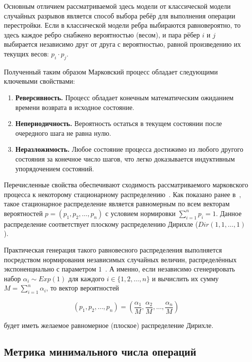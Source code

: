Основным отличием рассматриваемой здесь модели от классической модели случайных разрывов является способ выбора ребёр для выполнения операции перестройки.
Если в классической модели ребра выбираются равновероятно, то здесь каждое ребро снабжено вероятностью (весом), и пара рёбер $i$ и $j$ выбирается независимо друг от друга с вероятностью, равной произведению их текущих весов: $p_i \cdot p_j$.

Полученный таким образом Марковский процесс обладает следующими ключевыми свойствами:

\begin{enumerate}
    \item \textbf{Реверсивность.} Процесс обладает конечным математическим ожиданием времени возврата в исходное состояние.
    \item \textbf{Непериодичность.} Вероятность остаться в текущем состоянии после очередного шага не равна нулю.
    \item \textbf{Неразложимость.} Любое состояние процесса достижимо из любого другого состояния за конечное число шагов, что легко доказывается индуктивным упорядочением состояний.
\end{enumerate}

Перечисленные свойства обеспечивают сходимость рассматриваемого марковского процесса к некоторому стационарному распределению~\cite{teor-ver}.
Как показано ранее в~\cite{tannier2016}, такое стационарное распределение является равномерным по всем векторам вероятностей $p = (p_1, p_2, \dots, p_n)$ с условием нормировки $\sum_{i=1}^{n} p_i = 1$.
Данное распределение соответствует плоскому распределению Дирихле ($Dir(1, 1, \dots, 1)$).

Практическая генерация такого равновесного распределения выполняется посредством нормирования независимых случайных величин, распределённых экспоненциально с параметром $1$~\cite{generation}.
А именно, если независимо сгенерировать набор $\alpha_i \sim Exp(1)$ для каждого $i \in \{1,2,\dots,n\}$ и вычислить их сумму $M = \sum_{i=1}^{n} \alpha_i$, то вектор вероятностей

\[
(p_1, p_2, \ldots, p_n) 
= \left(\frac{\alpha_1}{M}, \frac{\alpha_2}{M}, \dots, \frac{\alpha_n}{M}\right)
\]

будет иметь желаемое равномерное (плоское) распределение Дирихле.

\subsection{Метрика минимального числа операций}
\label{sec:minimal_operations}

